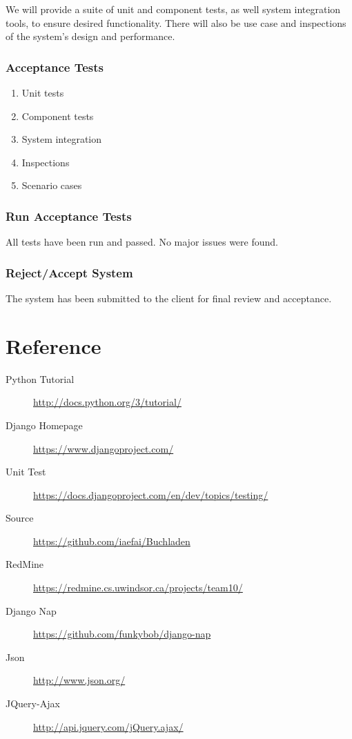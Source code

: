 \documentclass[11pt]{article}
\begin{document}
			We will provide a suite of unit and component tests, as well system integration tools, to ensure desired functionality. 
			There will also be use case and inspections of the system's design and performance.

		\subsubsection{Acceptance Tests}
			\begin{enumerate}
				\item Unit tests
				\item Component tests
				\item System integration
				\item Inspections
				\item Scenario cases
			\end{enumerate}

		\subsubsection{Run Acceptance Tests}
			All tests have been run and passed. No major issues were found.

		\subsubsection{Reject/Accept System}
			The system has been submitted to the client for final review and acceptance.
\section{Reference}
\label{sec-reference}

\begin{description}
\item[Python Tutorial] \href{http://docs.python.org/3/tutorial/}{http://docs.python.org/3/tutorial/}
\item[Django Homepage] \href{https://www.djangoproject.com/}{https://www.djangoproject.com/}
\item[Unit Test] \href{https://docs.djangoproject.com/en/dev/topics/testing/}{https://docs.djangoproject.com/en/dev/topics/testing/}
\item[Source] \href{https://github.com/iaefai/Buchladen}{https://github.com/iaefai/Buchladen}
\item[RedMine]
  \href{https://redmine.cs.uwindsor.ca/projects/team10/}{https://redmine.cs.uwindsor.ca/projects/team10/}
\item[Django Nap] \href{https://github.com/funkybob/django-nap}{https://github.com/funkybob/django-nap}
\item[Json] \href{http://www.json.org/}{http://www.json.org/}
\item[JQuery-Ajax] \href{http://api.jquery.com/jQuery.ajax/}{http://api.jquery.com/jQuery.ajax/}
\end{description}
\end{document}
